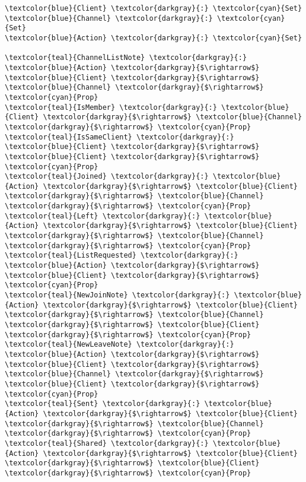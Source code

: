 \begin{Verbatim}[commandchars=\\\{\},codes={\catcode`$=3}]
\textcolor{blue}{Client} \textcolor{darkgray}{:} \textcolor{cyan}{Set}
\textcolor{blue}{Channel} \textcolor{darkgray}{:} \textcolor{cyan}{Set}
\textcolor{blue}{Action} \textcolor{darkgray}{:} \textcolor{cyan}{Set}

\textcolor{teal}{ChannelListNote} \textcolor{darkgray}{:} \textcolor{blue}{Action} \textcolor{darkgray}{$\rightarrow$} \textcolor{blue}{Client} \textcolor{darkgray}{$\rightarrow$} \textcolor{blue}{Channel} \textcolor{darkgray}{$\rightarrow$} \textcolor{cyan}{Prop}
\textcolor{teal}{IsMember} \textcolor{darkgray}{:} \textcolor{blue}{Client} \textcolor{darkgray}{$\rightarrow$} \textcolor{blue}{Channel} \textcolor{darkgray}{$\rightarrow$} \textcolor{cyan}{Prop}
\textcolor{teal}{IsSameClient} \textcolor{darkgray}{:} \textcolor{blue}{Client} \textcolor{darkgray}{$\rightarrow$} \textcolor{blue}{Client} \textcolor{darkgray}{$\rightarrow$} \textcolor{cyan}{Prop}
\textcolor{teal}{Joined} \textcolor{darkgray}{:} \textcolor{blue}{Action} \textcolor{darkgray}{$\rightarrow$} \textcolor{blue}{Client} \textcolor{darkgray}{$\rightarrow$} \textcolor{blue}{Channel} \textcolor{darkgray}{$\rightarrow$} \textcolor{cyan}{Prop}
\textcolor{teal}{Left} \textcolor{darkgray}{:} \textcolor{blue}{Action} \textcolor{darkgray}{$\rightarrow$} \textcolor{blue}{Client} \textcolor{darkgray}{$\rightarrow$} \textcolor{blue}{Channel} \textcolor{darkgray}{$\rightarrow$} \textcolor{cyan}{Prop}
\textcolor{teal}{ListRequested} \textcolor{darkgray}{:} \textcolor{blue}{Action} \textcolor{darkgray}{$\rightarrow$} \textcolor{blue}{Client} \textcolor{darkgray}{$\rightarrow$} \textcolor{cyan}{Prop}
\textcolor{teal}{NewJoinNote} \textcolor{darkgray}{:} \textcolor{blue}{Action} \textcolor{darkgray}{$\rightarrow$} \textcolor{blue}{Client} \textcolor{darkgray}{$\rightarrow$} \textcolor{blue}{Channel} \textcolor{darkgray}{$\rightarrow$} \textcolor{blue}{Client} \textcolor{darkgray}{$\rightarrow$} \textcolor{cyan}{Prop}
\textcolor{teal}{NewLeaveNote} \textcolor{darkgray}{:} \textcolor{blue}{Action} \textcolor{darkgray}{$\rightarrow$} \textcolor{blue}{Client} \textcolor{darkgray}{$\rightarrow$} \textcolor{blue}{Channel} \textcolor{darkgray}{$\rightarrow$} \textcolor{blue}{Client} \textcolor{darkgray}{$\rightarrow$} \textcolor{cyan}{Prop}
\textcolor{teal}{Sent} \textcolor{darkgray}{:} \textcolor{blue}{Action} \textcolor{darkgray}{$\rightarrow$} \textcolor{blue}{Client} \textcolor{darkgray}{$\rightarrow$} \textcolor{blue}{Channel} \textcolor{darkgray}{$\rightarrow$} \textcolor{cyan}{Prop}
\textcolor{teal}{Shared} \textcolor{darkgray}{:} \textcolor{blue}{Action} \textcolor{darkgray}{$\rightarrow$} \textcolor{blue}{Client} \textcolor{darkgray}{$\rightarrow$} \textcolor{blue}{Client} \textcolor{darkgray}{$\rightarrow$} \textcolor{cyan}{Prop}


\end{Verbatim}
